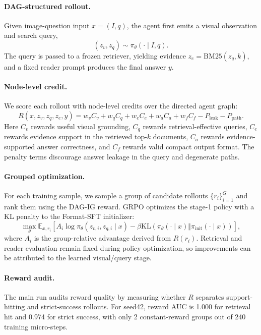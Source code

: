 
\paragraph{DAG-structured rollout.}
Given image-question input $x=(I,q)$, the agent first emits a visual observation and search query,
\[
  (z_v, z_q) \sim \pi_\theta(\cdot \mid I, q).
\]
The query is passed to a frozen retriever, yielding evidence $z_e=\mathrm{BM25}(z_q,k)$, and a fixed reader prompt produces the final answer $y$.

\paragraph{Node-level credit.}
We score each rollout with node-level credits over the directed agent graph:
\[
  R(x,z_v,z_q,z_e,y)
  = w_v C_v + w_q C_q + w_e C_e + w_a C_a + w_f C_f - P_{\mathrm{leak}} - P_{\mathrm{path}}.
\]
Here $C_v$ rewards useful visual grounding, $C_q$ rewards retrieval-effective queries, $C_e$ rewards evidence support in the retrieved top-$k$ documents, $C_a$ rewards evidence-supported answer correctness, and $C_f$ rewards valid compact output format. The penalty terms discourage answer leakage in the query and degenerate paths.

\paragraph{Grouped optimization.}
For each training sample, we sample a group of candidate rollouts $\{r_i\}_{i=1}^{G}$ and rank them using the DAG-IG reward. GRPO optimizes the stage-1 policy with a KL penalty to the Format-SFT initializer:
\[
  \max_\theta
  \mathbb{E}_{x, r_i}
  \left[
    A_i \log \pi_\theta(z_{v,i},z_{q,i}\mid x)
    - \beta \mathrm{KL}\left(\pi_\theta(\cdot\mid x)\Vert\pi_{\mathrm{init}}(\cdot\mid x)\right)
  \right],
\]
where $A_i$ is the group-relative advantage derived from $R(r_i)$. Retrieval and reader evaluation remain fixed during policy optimization, so improvements can be attributed to the learned visual/query stage.

\paragraph{Reward audit.}
The main run audits reward quality by measuring whether $R$ separates support-hitting and strict-success rollouts. For seed42, reward AUC is 1.000 for retrieval hit and 0.974 for strict success, with only 2 constant-reward groups out of 240 training micro-steps.
